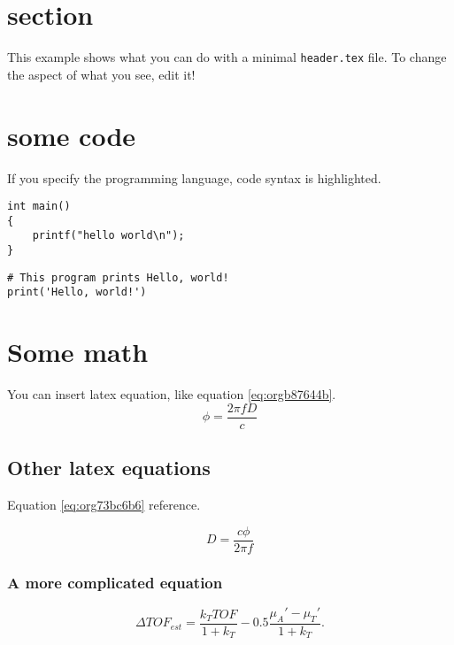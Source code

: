 


\maketitle

\newpage

\section{section}
\label{sec:org0f7efa9}
This example shows what you can do with a minimal \texttt{header.tex} file.
To change the aspect of what you see, edit it!

\section{some code}
\label{sec:org1e789d9}
If you specify the programming language, code syntax is highlighted.
\begin{verbatim}
int main()
{
    printf("hello world\n");
}
\end{verbatim}

\begin{verbatim}
# This program prints Hello, world!
print('Hello, world!')
\end{verbatim}

\section{Some math}
\label{sec:org38485ea}
You can insert latex equation, like equation \ref{eq:orgb87644b}.
\begin{equation}
\label{eq:orgb87644b}
\phi = \frac{2\pi fD}{c}
\end{equation}
\subsection{Other latex equations}
\label{sec:org46c6658}
Equation \ref{eq:org73bc6b6} reference.

\begin{equation}
\label{eq:org73bc6b6}
D = \frac{c\phi}{2\pi f}
\end{equation}

\subsubsection{A more complicated equation}
\label{sec:org9d84b64}

\begin{equation}
\Delta TOF_{est} = \frac{k_T TOF}{1+k_T } - 0.5 \frac{\mu_A' - \mu_T'}{1+k_T}.
\end{equation}

